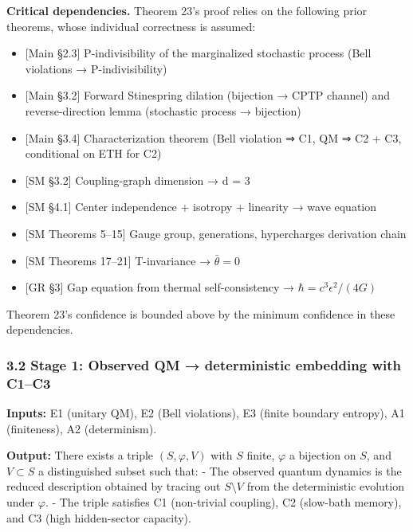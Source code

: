 \documentclass[
]{article}
\providecommand{\tightlist}{%
  \setlength{\itemsep}{0pt}\setlength{\parskip}{0pt}}
\begin{document}
\textbf{Critical dependencies.} Theorem 23's proof relies on the
following prior theorems, whose individual correctness is assumed:

\begin{itemize}
\tightlist
\item
  {[}Main §2.3{]} P-indivisibility of the marginalized stochastic
  process (Bell violations → P-indivisibility)
\item
  {[}Main §3.2{]} Forward Stinespring dilation (bijection → CPTP
  channel) and reverse-direction lemma (stochastic process → bijection)
\item
  {[}Main §3.4{]} Characterization theorem (Bell violation ⇒ C1, QM ⇒ C2
  + C3, conditional on ETH for C2)
\item
  {[}SM §3.2{]} Coupling-graph dimension → d = 3
\item
  {[}SM §4.1{]} Center independence + isotropy + linearity → wave
  equation
\item
  {[}SM Theorems 5--15{]} Gauge group, generations, hypercharges
  derivation chain
\item
  {[}SM Theorems 17--21{]} T-invariance → \(\bar\theta = 0\)
\item
  {[}GR §3{]} Gap equation from thermal self-consistency →
  \(\hbar = c^3 \epsilon^2 / (4G)\)
\end{itemize}

Theorem 23's confidence is bounded above by the minimum confidence in
these dependencies.

\hypertarget{stage-1-observed-qm-deterministic-embedding-with-c1c3}{%
\subsubsection{3.2 Stage 1: Observed QM → deterministic embedding with
C1--C3}\label{stage-1-observed-qm-deterministic-embedding-with-c1c3}}

\textbf{Inputs:} E1 (unitary QM), E2 (Bell violations), E3 (finite
boundary entropy), A1 (finiteness), A2 (determinism).

\textbf{Output:} There exists a triple \((S, \varphi, V)\) with \(S\)
finite, \(\varphi\) a bijection on \(S\), and \(V \subset S\) a
distinguished subset such that: - The observed quantum dynamics is the
reduced description obtained by tracing out \(S \setminus V\) from the
deterministic evolution under \(\varphi\). - The triple satisfies C1
(non-trivial coupling), C2 (slow-bath memory), and C3 (high
hidden-sector capacity).
\end{document}
